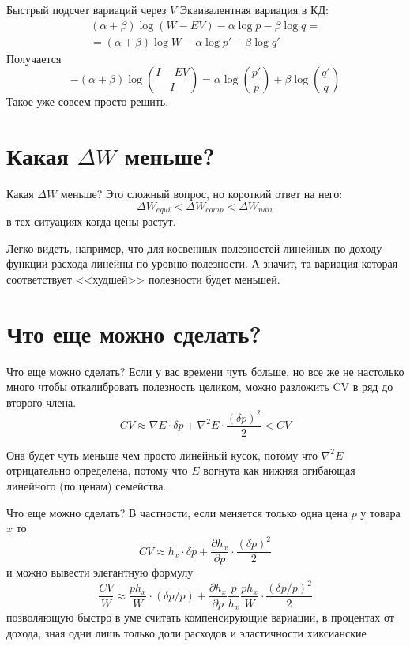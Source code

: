 \documentclass{beamer}
\begin{document}
\begin{frame}{Быстрый подсчет вариаций через $V$}
Эквивалентная вариация в КД:
\begin{gather*}
 (\alpha + \beta)\log (W - EV) - \alpha \log p - \beta \log q = \\ =
  (\alpha + \beta)\log W - \alpha \log p' - \beta \log q'
\end{gather*}
Получается
$$-(\alpha + \beta)\log(\frac{I - EV}{I}) = \alpha \log (\frac{p'}{p}) + \beta \log (\frac{q'}{q}) $$
Такое уже совсем просто решить.
\end{frame}

\section{Какая $\Delta W$ меньше?}

\begin{frame}{Какая $\Delta W$ меньше?}
Это сложный вопрос, но короткий ответ на него: 
$$\Delta W_{equi} < \Delta W_{comp} < \Delta W_{naiv}$$ в тех ситуациях когда цены растут.

Легко видеть, например, что для косвенных полезностей линейных по доходу функции расхода линейны по уровню полезности. А значит, та вариация которая соответствует <<худшей>> полезности будет меньшей.
\end{frame}

\section{Что еще можно сделать?}

\begin{frame}{Что еще можно сделать?}
Если у вас времени чуть больше, но все же не настолько много чтобы откалибровать полезность целиком, можно разложить CV в ряд до второго члена.
$$CV \approx \nabla E \cdot \delta p + \nabla^2 E \cdot \frac{(\delta p)^2}{2}  < CV$$

Она будет чуть меньше чем просто линейный кусок, потому что $\nabla^2 E$ отрицательно определена, потому что $E$ вогнута как нижняя огибающая линейного (по ценам) семейства.

\end{frame}

\begin{frame}{Что еще можно сделать?}
В частности, если меняется только одна цена $p$ у товара $x$ то
$$CV \approx h_x \cdot \delta p + \frac{\partial h_x}{\partial p} \cdot \frac{(\delta p)^2}{2}$$
и можно вывести элегантную формулу
$$\frac{CV}{W} \approx \frac{p h_x}{W} \cdot (\delta p / p) + \frac{\partial h_x}{\partial p}\frac{p}{h_x} \frac{p h_x}{W}\cdot \frac{(\delta p/p)^2}{2}$$
позволяющую быстро в уме считать компенсирующие вариации, в процентах от дохода, зная одни лишь только доли расходов и эластичности хиксианские

\end{frame}
\end{document}
